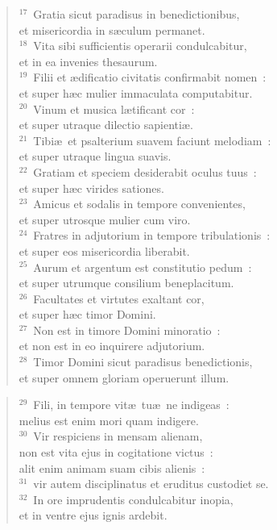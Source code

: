 \begin{flushleft}\begin{verse}${}^{17}$~Gratia sicut paradisus in benedictionibus,\\ et misericordia in s\ae culum permanet.\\
${}^{18}$~Vita sibi sufficientis operarii condulcabitur,\\ et in ea invenies thesaurum.\\
${}^{19}$~Filii et \ae dificatio civitatis confirmabit nomen~:\\ et super h\ae c mulier immaculata computabitur.\\
${}^{20}$~Vinum et musica l\ae tificant cor~:\\ et super utraque dilectio sapienti\ae .\\
${}^{21}$~Tibi\ae\ et psalterium suavem faciunt melodiam~:\\ et super utraque lingua suavis.\\
${}^{22}$~Gratiam et speciem desiderabit oculus tuus~:\\ et super h\ae c virides sationes.\\
${}^{23}$~Amicus et sodalis in tempore convenientes,\\ et super utrosque mulier cum viro.\\
${}^{24}$~Fratres in adjutorium in tempore tribulationis~:\\ et super eos misericordia liberabit.\\
${}^{25}$~Aurum et argentum est constitutio pedum~:\\ et super utrumque consilium beneplacitum.\\
${}^{26}$~Facultates et virtutes exaltant cor,\\ et super h\ae c timor Domini.\\
${}^{27}$~Non est in timore Domini minoratio~:\\ et non est in eo inquirere adjutorium.\\
${}^{28}$~Timor Domini sicut paradisus benedictionis,\\ et super omnem gloriam operuerunt illum.\end{verse}\end{flushleft}


\begin{flushleft}\begin{verse}${}^{29}$~Fili, in tempore vit\ae\ tu\ae\ ne indigeas~:\\ melius est enim mori quam indigere.\\
${}^{30}$~Vir respiciens in mensam alienam,\\ non est vita ejus in cogitatione victus~:\\ alit enim animam suam cibis alienis~:\\
${}^{31}$~vir autem disciplinatus et eruditus custodiet se.\\
${}^{32}$~In ore imprudentis condulcabitur inopia,\\ et in ventre ejus ignis ardebit.\end{verse}\end{flushleft}


